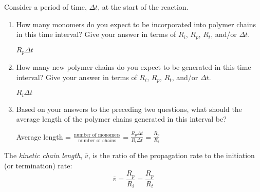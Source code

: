 \begin{activity}
\begin{ctqs}
	\question Consider a period of time, $\Delta t$, at the start of the reaction.
	
		\begin{enumerate}
			
			\item How many monomers do you expect to be incorporated into polymer chains in this time interval?  Give your answer in terms of $R_i$, $R_p$, $R_t$, and/or $\Delta t$.
			
				\begin{solution}[0.5in]
				
					$R_p \Delta t$
					
				\end{solution}
			
			\item How many new polymer chains do you expect to be generated in this time interval?  Give your answer in terms of $R_i$, $R_p$, $R_t$, and/or $\Delta t$.
			
				\begin{solution}[0.5in]
				
					$R_i \Delta t$
					
				\end{solution}
			
			\item Based on your answers to the preceding two questions, what should the average length of the polymer chains generated in this interval be?
			
				\begin{solution}[0.5in]
				
					Average length = $\frac{\text{number of monomers}}{\text{number of chains}} = \frac{R_p\Delta t}{R_i \Delta t} = \frac{R_p}{R_i}$				
				
				\end{solution}
				
		\end{enumerate}
	
\end{ctqs}

\begin{infobox}
	The \emph{kinetic chain length}, $\bar v$, is the ratio of the propagation rate to the initiation (or termination) rate:
	\begin{equation*}
		\bar v = \frac{R_p}{R_i} = \frac{R_p}{R_t}
	\end{equation*}
\end{infobox}

\begin{ctqs}


\end{ctqs}
\end{activity}
